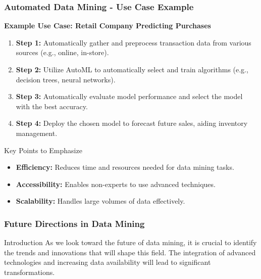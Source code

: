\documentclass{beamer}
\begin{document}
\begin{frame}[fragile]
    \frametitle{Automated Data Mining - Use Case Example}
    \textbf{Example Use Case: Retail Company Predicting Purchases}
    \begin{enumerate}
        \item \textbf{Step 1:} Automatically gather and preprocess transaction data from various sources (e.g., online, in-store).
        \item \textbf{Step 2:} Utilize AutoML to automatically select and train algorithms (e.g., decision trees, neural networks).
        \item \textbf{Step 3:} Automatically evaluate model performance and select the model with the best accuracy.
        \item \textbf{Step 4:} Deploy the chosen model to forecast future sales, aiding inventory management.
    \end{enumerate}

    \begin{block}{Key Points to Emphasize}
        \begin{itemize}
            \item \textbf{Efficiency:} Reduces time and resources needed for data mining tasks.
            \item \textbf{Accessibility:} Enables non-experts to use advanced techniques.
            \item \textbf{Scalability:} Handles large volumes of data effectively.
        \end{itemize}
    \end{block}
\end{frame}

\begin{frame}[fragile]
    \frametitle{Future Directions in Data Mining}
    \begin{block}{Introduction}
        As we look toward the future of data mining, it is crucial to identify the trends and innovations that will shape this field. 
        The integration of advanced technologies and increasing data availability will lead to significant transformations.
    \end{block}
\end{frame}
\end{document}
